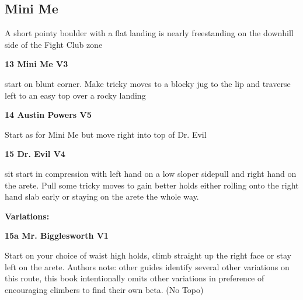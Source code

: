 \begin{multicols}{2}
\needspace{1.5cm}
\subsection*{Mini Me}\label{bf:Mini Me}
A short pointy boulder with a flat landing is nearly freestanding on the downhill side of the Fight Club zone\\
	


\needspace{1.5cm}
\label{rt:Mini Me}
\colorbox{green!20}{
\parbox{0.95\linewidth}{
\textbf{
13 Mini Me V3  
}}}

\begin{adjustwidth}{0.5cm}{}			
start on blunt corner. Make tricky moves to a blocky jug to the lip and traverse left to an easy top over a rocky landing
\end{adjustwidth}



\needspace{1.5cm}
\label{rt:Austin Powers}
\colorbox{RoyalBlue!20}{
\parbox{0.95\linewidth}{
\textbf{
14 Austin Powers V5  
}}}

\begin{adjustwidth}{0.5cm}{}			
Start as for Mini Me but move right into top of Dr. Evil
\end{adjustwidth}



\needspace{1.5cm}
\label{rt:Dr. Evil}
\colorbox{RoyalBlue!20}{
\parbox{0.95\linewidth}{
\textbf{
15 Dr. Evil V4  
}}}

\begin{adjustwidth}{0.5cm}{}			
sit start in compression with left hand on a low sloper sidepull and right hand on the arete. Pull some tricky moves to gain better holds either rolling onto the right hand slab early or staying on the arete the whole way.
\end{adjustwidth}

\begin{adjustwidth}{0.5cm}{}				
\needspace{3cm}
\textbf{Variations:} \newline

\needspace{1.5cm}
\label{vr:Mr. Bigglesworth}
\colorbox{green!20}{
\parbox{0.95\linewidth}{
\textbf{
15a Mr. Bigglesworth V1  
}}}

\begin{adjustwidth}{0.5cm}{}			
Start on your choice of waist high holds, climb straight up the right face or stay left on the arete. Authors note: other guides identify several other variations on this route, this book intentionally omits other variations in preference of encouraging climbers to find their own beta. (No Topo)
\end{adjustwidth}



\end{adjustwidth}
\end{multicols}
